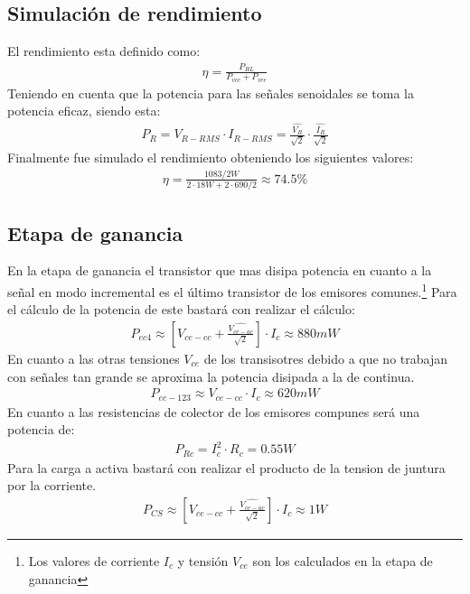 %
%
%


\subsection{Simulación de  rendimiento}
El rendimiento esta definido como:
\begin{align}
\eta = \frac{P_{RL}}{P_{vcc}+P_{vee}}
\end{align}
Teniendo en cuenta que la potencia para las señales senoidales se toma la potencia eficaz, siendo esta:
\begin{align}
P_{R}=V_{R-RMS}\cdot I_{R-RMS} =\frac{\hat{V_{R}}}{\sqrt{2}} \cdot \frac{\hat{I_{R}}}{\sqrt{2}}
\end{align}
Finalmente fue simulado el rendimiento obteniendo los siguientes valores:
\begin{align}
\eta=\frac{1083 / 2 W}{ 2\cdot 18 W + 2 \cdot 690 /2}\approx 74.5 \%
\end{align}
\subsection{Etapa de ganancia}
En la etapa de ganancia el transistor que mas disipa potencia en cuanto a la señal en modo incremental es el último transistor de los emisores comunes.\footnote{Los valores de corriente $I_c$ y tensión $V_{ce}$ son los calculados en la etapa de ganancia}
Para el cálculo de la potencia de este bastará con realizar el cálculo:
\begin{align}
P_{ec4}\approx\left[V_{ce-cc} + \frac{\hat{V_{ce-ac}}}{\sqrt{2}}\right]\cdot I_c\approx 880mW
\end{align}
En cuanto a las otras tensiones $V_{ce}$ de los transisotres debido a que no trabajan con señales tan grande se aproxima la potencia disipada a la de continua.
\begin{align}
P_{ec-123}\approx V_{ce-cc} \cdot I_c \approx 620mW
\end{align}
En cuanto a las resistencias de colector de los emisores compunes será una potencia de:
\begin{align}
P_{Rc}= I_c^2 \cdot R_c= 0.55 W
\end{align}
 Para la carga a activa bastará con realizar el producto de la tension de juntura por la corriente.
\begin{align}
P_{CS}\approx\left[V_{ce-cc} + \frac{\hat{V_{ce-ac}}}{\sqrt{2}}\right]\cdot I_c\approx 1W
\end{align}


